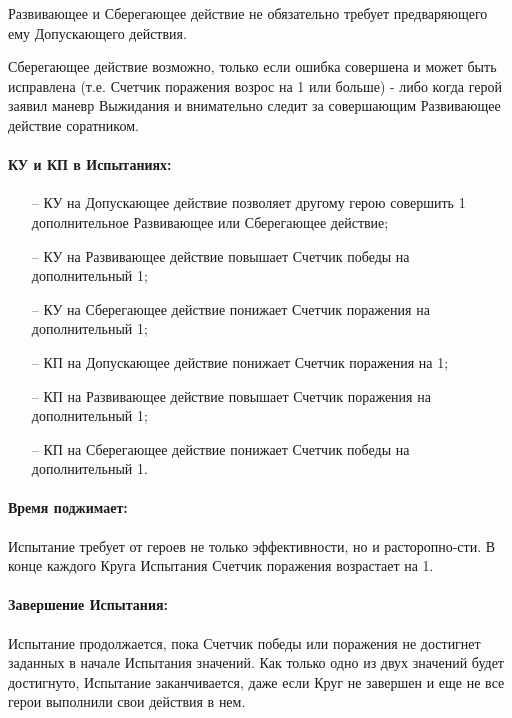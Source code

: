 \begin{itemize}
\begin{tcolorbox}
    Развивающее и Сберегающее действие не обязательно требует предваряющего ему Допускающего действия.\tbd
\end{tcolorbox}
\begin{tcolorbox}
Сберегающее действие возможно, только если ошибка совершена и может быть исправлена (т.е. Счетчик поражения возрос на 1 или больше) - либо когда герой заявил маневр Выжидания и внимательно следит за совершающим Развивающее действие соратником.
\end{tcolorbox}
\end{itemize}

\paragraph{КУ и КП в Испытаниях:}
\begin{itemize}
    \item[--] КУ на Допускающее действие позволяет другому герою совершить 1 дополнительное Развивающее или Сберегающее действие;
    \item[--] КУ на Развивающее действие повышает Счетчик победы на дополнительный 1;
    \item[--] КУ на Сберегающее действие понижает Счетчик поражения на дополнительный 1;
    \item[--] КП на Допускающее действие понижает Счетчик поражения на 1;
    \item[--] КП на Развивающее действие повышает Счетчик поражения на дополнительный 1;
    \item[--] КП на Сберегающее действие понижает Счетчик победы на дополнительный 1.
\end{itemize}

\paragraph{Время поджимает:} Испытание требует от героев не только эффективности, но и расторопно-сти. В конце каждого Круга Испытания Счетчик поражения возрастает на 1.
\paragraph{Завершение Испытания:} Испытание продолжается, пока Счетчик победы или поражения не достигнет заданных в начале Испытания значений. Как только одно из двух значений будет достигнуто, Испытание заканчивается, даже если Круг не завершен и еще не все герои выполнили свои действия в нем.
